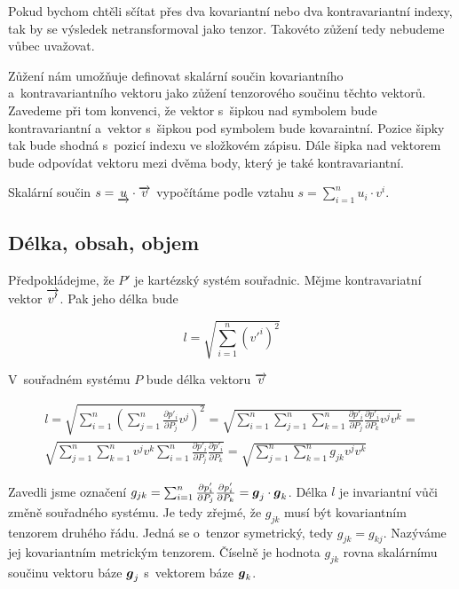 Pokud bychom chtěli sčítat přes dva kovariantní nebo dva kontravariantní indexy, tak by se výsledek netransformoval jako tenzor. Takovéto zůžení tedy nebudeme
vůbec uvažovat.

Zůžení nám umožňuje definovat skalární součin kovariantního a~kontravariantního vektoru jako zůžení tenzorového součinu těchto vektorů. Zavedeme při tom
konvenci, že vektor s~šipkou nad symbolem bude kontravariantní a~vektor s~šipkou pod symbolem bude kovaraintní. Pozice šipky tak bude shodná s~pozicí
indexu ve složkovém zápisu. Dále šipka nad vektorem bude odpovídat vektoru mezi dvěma body, který je také kontravariantní.

\begin{fact}
Skalární součin \(s = \underrightarrow{u} \cdot \overrightarrow{v}\) vypočítáme podle vztahu \(s = \sum_{i=1}^n u_i \cdot v^i\).
\end{fact}

\subsection{Délka, obsah, objem}

Předpokládejme, že \(P'\) je kartézský systém souřadnic. Mějme kontravariatní vektor \(\overrightarrow{v'}\). Pak jeho délka bude

\begin{equation}
l = \sqrt{\sum_{i=1}^n (v'^i)^2}
\end{equation}

V~souřadném systému \(P\) bude délka vektoru \(\overrightarrow{v}\)

\begin{equation}
\begin{split}
l = \sqrt{\sum_{i=1}^n \left(\sum_{j=1}^n \frac{\partial p'_i}{\partial P_j} v^j \right)^2} = \sqrt{\sum_{i=1}^n \sum_{j=1}^n \sum_{k=1}^n \frac{\partial p'_i}{\partial P_j} \frac{\partial p'_i}{\partial P_k} v^j v^k} = \\
\sqrt{\sum_{j=1}^n \sum_{k=1}^n v^j v^k \sum_{i=1}^n \frac{\partial p'_i}{\partial P_j} \frac{\partial p'_i}{\partial P_k}} = \sqrt{\sum_{j=1}^n \sum_{k=1}^n g_{jk} v^j v^k}
\end{split}
\end{equation}

Zavedli jsme označení \(g_{jk} = \sum_{i=1}^n \frac{\partial p'_i}{\partial P_j} \frac{\partial p'_i}{\partial P_k} = \boldsymbol{g}_j \cdot \boldsymbol{g}_k\). Délka \(l\) je invariantní vůči změně souřadného systému. Je tedy zřejmé, že \(g_{jk}\) musí být kovariantním tenzorem druhého řádu. Jedná se o~tenzor symetrický, tedy \(g_{jk} = g_{kj}\). Nazýváme jej kovariantním metrickým tenzorem. Číselně je hodnota \(g_{jk}\) rovna skalárnímu součinu vektoru báze \(\boldsymbol{g}_j\) s~vektorem báze \(\boldsymbol{g}_k\).

